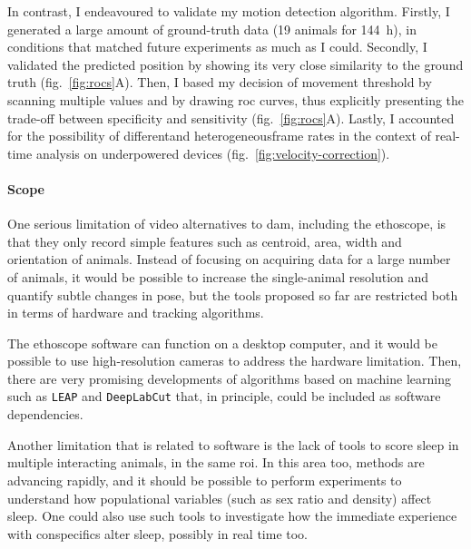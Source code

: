 In contrast, I endeavoured to validate my motion detection algorithm. 
Firstly, I generated a large amount of ground-truth data (19 animals for 144~h), in conditions that matched future experiments as much as I could.
Secondly, I validated the predicted position by showing its very close similarity to the ground truth  (fig.~\ref{fig:rocs}A).
Then, I based my decision of movement threshold by scanning multiple values and by drawing \gls{roc} curves, thus explicitly presenting the trade-off between specificity and sensitivity  (fig.~\ref{fig:rocs}A).
Lastly, I accounted for the possibility of different\emd{}and heterogeneous\emd{}frame rates in the context of real-time analysis on underpowered devices (fig.~\ref{fig:velocity-correction}).

\paragraph*{Scope}

One serious limitation of video alternatives to \gls{dam}, including the ethoscope, is that they only record simple features such as centroid, area, width and orientation of animals. 
Instead of focusing on acquiring data for a large number of animals, it would be possible to increase the single-animal resolution and quantify subtle changes in pose, but the tools proposed so far are restricted both in terms of hardware and tracking algorithms.

The ethoscope software can function on a desktop computer, and it would be possible to use high-resolution cameras to address the hardware limitation.
Then, there are very promising developments of algorithms based on machine learning such as \texttt{LEAP}\cite{pereira_fast_2018} and \texttt{DeepLabCut}\cite{mathis_markerless_2018} that, in principle, could be included as software dependencies.

Another limitation that is related to software is the lack of tools to score sleep in multiple interacting animals, in the same \gls{roi}.
In this area too, methods are advancing rapidly\cite{perez-escudero_idtracker_2014,romero-ferrero_idtracker.ai_2018}, and it should be possible to perform experiments to understand how populational variables (such as sex ratio and density) affect sleep.
One could also use such tools to investigate how the immediate experience with conspecifics alter sleep, possibly in real time too.


